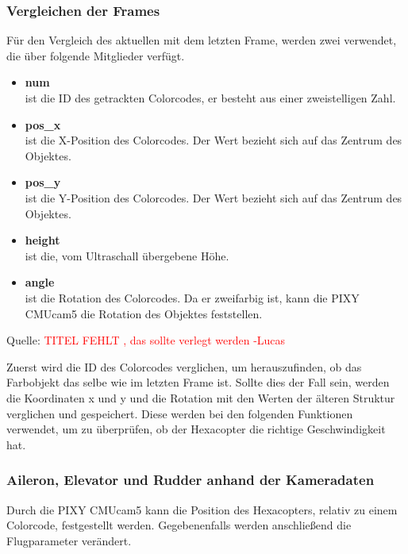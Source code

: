 \begin{itemize}
    \subsubsection{Vergleichen der Frames}
    Für den Vergleich des aktuellen mit dem letzten Frame, werden zwei  verwendet, die über folgende Mitglieder verfügt.
    \begin{itemize}
      \item \textbf{num}\\
      ist die ID des getrackten Colorcodes, er besteht aus einer zweistelligen Zahl.
      \item \textbf{pos\_x}\\
      ist die X-Position des Colorcodes. Der Wert bezieht sich auf das Zentrum des Objektes.
      \item \textbf{pos\_y}\\
      ist die Y-Position des Colorcodes. Der Wert bezieht sich auf das Zentrum des Objektes.
      \item \textbf{height}\\
      ist die, vom Ultraschall übergebene Höhe.
      \item \textbf{angle}\\
      ist die Rotation des Colorcodes. Da er zweifarbig ist, kann die PIXY CMUcam5 die Rotation des Objektes feststellen.
    \end{itemize}

    Quelle: \textcolor{red}{TITEL FEHLT \cite{Structs}, das sollte verlegt werden -Lucas}

    Zuerst wird die ID des Colorcodes verglichen, um herauszufinden, ob das Farbobjekt das selbe wie im letzten Frame ist.
    Sollte dies der Fall sein, werden die Koordinaten x und y und die Rotation mit den Werten der älteren Struktur verglichen und gespeichert.
    Diese werden bei den folgenden Funktionen verwendet, um zu überprüfen, ob der Hexacopter die richtige Geschwindigkeit hat.

    \subsubsection{Aileron, Elevator und Rudder anhand der Kameradaten}
    Durch die PIXY CMUcam5 kann die Position des Hexacopters, relativ zu einem Colorcode, festgestellt werden. Gegebenenfalls werden anschließend die Flugparameter verändert.


\end{itemize}
